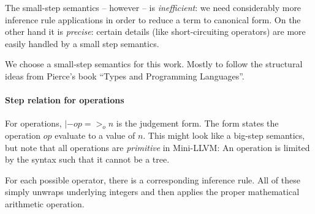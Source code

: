 \documentclass[a4paper, oneside, 10pt, draft]{memoir}
\begin{document}
The small-step semantics -- however -- is \emph{inefficient}: we need
considerably more inference rule applications in order to reduce a
term to canonical form. On the other hand it is \emph{precise}:
certain details (like short-circuiting operators) are more easily
handled by a small step semantics.

We choose a small-step semantics for this work. Mostly to follow the
structural ideas from Pierce's book ``Types and Programming
Languages''.

\paragraph{Step relation for operations}

\newcommand{\eop}{=>_{o}}
For operations, $\boxed{|- op \eop n}$ is the judgement form. The form
states the operation $op$ evaluate to a value of $n$. This
might look like a big-step semantics, but note that all operations are
\emph{primitive} in Mini-LLVM: An operation is limited by the syntax
such that it cannot be a tree.

For each possible operator, there is a corresponding inference
rule. All of these simply unwraps underlying integers and then applies
the proper mathematical arithmetic operation.
\end{document}
